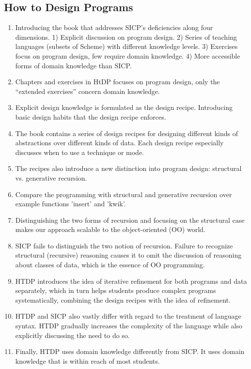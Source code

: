 \documentclass{article}
\begin{document}
\subsection{How to Design Programs}

\begin{enumerate}
\item Introducing the book that addresses SICP's deficiencies along
  four dimensions. 1) Explicit discussion on program design. 2) Series
  of teaching languages (subsets of Scheme) with different knowledge
  levels. 3) Exercises focus on program design, few require domain
  knowledge. 4) More accessible forms of domain knowledge than SICP.
\item Chapters and exercises in HtDP focuses on program design, only
  the ``extended exercises'' concern domain knowledge.
\item Explicit design knowledge is formulated as the design
  recipe. Introducing basic design habits that the design recipe
  enforces.
\item The book contains a series of design recipes for designing
  different kinds of abstractions over different kinds of data. Each
  design recipe especially discusses when to use a technique or mode.
\item The recipes also introduce a new distinction into program
  design: structural vs. generative recursion.
\item Compare the programming with structural and generative recursion
  over example functions 'insert' and 'kwik'.
\item Distinguishing the two forms of recursion and focusing on the
  structural case makes our approach scalable to the object-oriented
  (OO) world.
\item SICP fails to distinguish the two notion of recursion. Failure
  to recognize structural (recursive) reasoning causes it to omit the
  discussion of reasoning about classes of data, which is the essence
  of OO programming.
\item HTDP introduces the idea of iterative refinement for both
  programs and data separately, which in turn helps students produce
  complex programs systematically, combining the design recipes with
  the idea of refinement.
\item HTDP and SICP also vastly differ with regard to the treatment of
  language syntax. HTDP gradually increases the complexity of the
  language while also explicitly discussing the need to do so.
\item Finally, HTDP uses domain knowledge differently from SICP. It
  uses domain knowledge that is within reach of most students.
\end{enumerate}
\end{document}
